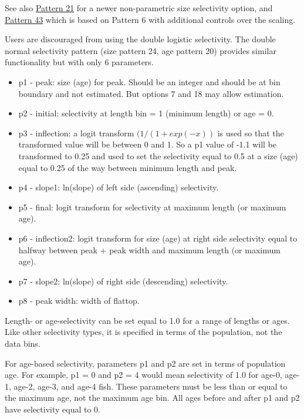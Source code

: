See also \hyperlink{NonParamSelectivity21}{Pattern 21} for a newer non-parametric size selectivity option, and \hyperlink{NonParamScaling}{Pattern 43} which is based on Pattern 6 with additional controls over the scaling.

\hypertarget{DoubleLogSelectivity}{}
Users are discouraged from using the double logistic selectivity. The double normal selectivity pattern (size pattern 24, age pattern 20) provides similar functionality but with only 6 parameters.
	\begin{itemize}
		\item p1 - peak: size (age) for peak. Should be an integer and should be at bin boundary and not estimated. But options 7 and 18 may allow estimation.
		\item p2 - initial: selectivity at length bin = 1 (minimum length) or age = 0.
		\item p3 - inflection: a logit transform $(1/(1+exp(-x))$ is used so that the transformed value will be between 0 and 1. So a p1 value of -1.1 will be transformed to 0.25 and used to set the selectivity equal to 0.5 at a size (age) equal to 0.25 of the way between minimum length and peak. 
		\item p4 - slope1: ln(slope) of left side (ascending) selectivity.
		\item p5 - final: logit transform for selectivity at maximum length (or maximum age).
		\item p6 - inflection2: logit transform for size (age) at right side selectivity equal to halfway between peak + peak width and maximum length (or maximum age).
		\item p7 - slope2: ln(slope) of right side (descending) selectivity.
		\item p8 - peak width: width of flattop.
	\end{itemize}

\hypertarget{SelectivityOneRange}{}
Length- or age-selectivity can be set equal to 1.0 for a range of lengths or ages. Like other selectivity types, it is specified in terms of the population, not the data bins.

For age-based selectivity, parameters p1 and p2 are set in terms of population age. For example, p1 = 0 and p2 = 4 would mean selectivity of 1.0 for age-0, age-1, age-2, age-3, and age-4 fish. These parameters must be less than or equal to the maximum age, not the maximum age bin. All ages before and after p1 and p2 have selectivity equal to 0.

